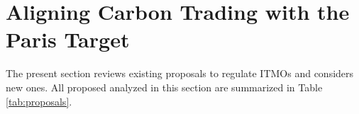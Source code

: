 \documentclass[12pt,english]{article}
\begin{document}


\section{Aligning Carbon Trading with the Paris Target}\label{sec:itmo} %

The present section reviews existing proposals to regulate ITMOs and considers new ones. %
All proposed analyzed in this section are summarized in Table \ref{tab:proposals}.
\end{document}
